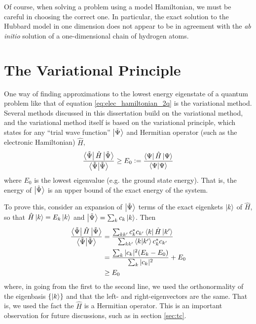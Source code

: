 Of course, when solving a problem using a model Hamiltonian, we must be careful in choosing the correct one. In particular, the exact solution to the Hubbard model in one dimension\cite{Lieb1968a} does not appear to be in agreement with the \emph{ab initio} solution of a one-dimensional chain of hydrogen atoms.\cite{Motta2017,Motta2020}

\section{The Variational Principle}
\label{sec:variational_principle}

One way of finding approximations to the lowest energy eigenstate of a quantum problem like that of equation \ref{eq:elec_hamiltonian_2q} is the variational method. Several methods discussed in this dissertation build on the variational method, and the variational method itself is based on the variational principle, which states\cite{sakuraiModern2017} for any ``trial wave function'' $\ket{\tilde\Psi}$ and Hermitian operator (such as the electronic Hamiltonian) $\hat H$,
\begin{equation}
    \label{eq:variational_principle}
    \frac{\bra{\tilde\Psi}\hat H\ket{\tilde\Psi}}{\braket{\tilde\Psi}}
    \ge E_0 \mathrel{\mathop:}=  \frac{\bra{\Psi}\hat H\ket{\Psi}}{\braket{\Psi}}
\end{equation}
where $E_0$ is the lowest eigenvalue (e.g. the ground state energy). That is, the energy of $\ket{\tilde\Psi}$ is an upper bound of the exact energy of the system.

To prove this, consider an expansion of $\ket{\tilde\Psi}$ terms of the exact eigenkets $\ket k$ of $\hat H$, so that $\hat H\ket k = E_k\ket k$ and $\ket{\tilde\Psi}=\sum_kc_k\ket k$. Then
\begin{align}
\label{eq:var_proof}
    \begin{split}
    \frac{\bra{\tilde\Psi}\hat H\ket{\tilde\Psi}}{\braket{\tilde\Psi}}
    &=
    \frac{\sum_{kk'}c_k^*c_{k'}\bra{k}\hat H\ket{k'}}{\sum_{kk'}\bra{k}\ket{k'}c_k^*c_{k'}}\\
    &= \frac{\sum_k|c_k|^2(E_k-E_0)}{\sum_k|c_k|^2} + E_0 \\
    &\ge E_0
\end{split}
\end{align}
where, in going from the first to the second line, we used the orthonormality of the eigenbasis $\{\ket k\}$ and that the left- and right-eigenvectors are the same. That is, we used the fact the $\hat H$ is a Hermitian operator. This is an important observation for future discussions, such as in section \ref{sec:tc}.

